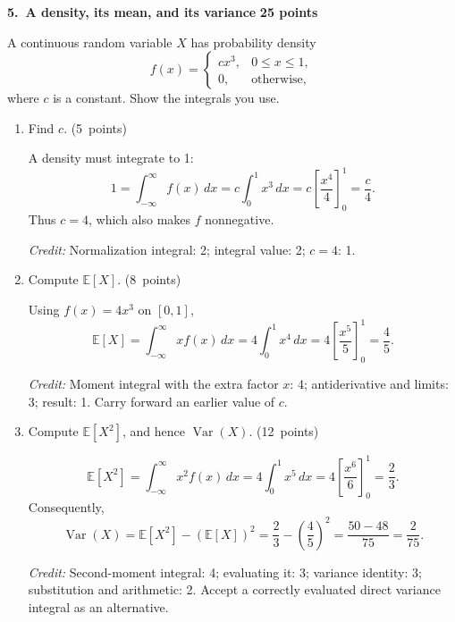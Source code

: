 \documentclass[11pt,letterpaper]{article}
\newcommand{\E}{\mathbb E}
\DeclareMathOperator{\Var}{Var}
\newcommand{\partpts}[1]{\unskip\nobreak\hspace{.3em}%
  \mbox{\small\color{muted}(#1 points)}}
\newcommand{\credit}[1]{\par{\footnotesize\color{muted}\textit{Credit:} #1}}
\newcommand{\problem}[3]{\par\addvspace{9pt}%
  {\large\bfseries\color{indigo}#1.\ #2}\hfill
  {\small\color{muted}\textbf{#3 points}}\par\nobreak}
\begin{document}
\newpage
\problem{5}{A density, its mean, and its variance}{25}
A continuous random variable $X$ has probability density
\[
f(x)=\begin{cases}
cx^3,&0\le x\le1,\\
0,&\text{otherwise},
\end{cases}
\]
where $c$ is a constant. Show the integrals you use.
\begin{enumerate}
\item Find $c$. \partpts{5}
\begin{solution}[1.4in]
A density must integrate to 1:
\[
1=\int_{-\infty}^{\infty}f(x)\,dx
=c\int_0^1 x^3\,dx
=c\left[\frac{x^4}{4}\right]_0^1=\frac c4.
\]
Thus $c=4$, which also makes $f$ nonnegative.
\credit{Normalization integral: 2; integral value: 2; $c=4$: 1.}
\end{solution}
\item Compute $\E[X]$. \partpts{8}
\begin{solution}[1.5in]
Using $f(x)=4x^3$ on $[0,1]$,
\[
\E[X]=\int_{-\infty}^{\infty}x f(x)\,dx
=4\int_0^1 x^4\,dx
=4\left[\frac{x^5}{5}\right]_0^1=\frac45.
\]
\credit{Moment integral with the extra factor $x$: 4;
antiderivative and limits: 3; result: 1. Carry forward an earlier value of $c$.}
\end{solution}
\item Compute $\E[X^2]$, and hence $\Var(X)$. \partpts{12}
\begin{solution}[2in]
\[
\E[X^2]=\int_{-\infty}^{\infty}x^2 f(x)\,dx
=4\int_0^1 x^5\,dx
=4\left[\frac{x^6}{6}\right]_0^1=\frac23.
\]
Consequently,
\[
\Var(X)=\E[X^2]-(\E[X])^2
=\frac23-\left(\frac45\right)^2
=\frac{50-48}{75}=\frac2{75}.
\]
\credit{Second-moment integral: 4; evaluating it: 3;
variance identity: 3; substitution and arithmetic: 2.
Accept a correctly evaluated direct variance integral as an alternative.}
\end{solution}
\end{enumerate}
\end{document}
